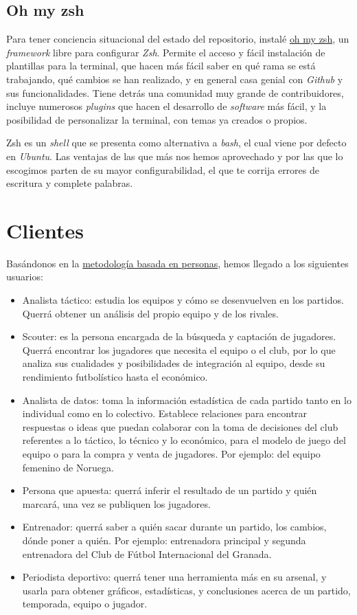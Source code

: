 \subsection{Oh my zsh}
Para tener conciencia situacional del estado del repositorio, instalé \href{https://ohmyz.sh/}{oh my zsh}, 
un \textit{framework} libre para configurar \textit{Zsh}. Permite el acceso y fácil instalación de plantillas para 
la terminal, que hacen más fácil saber en qué rama se está trabajando, qué cambios se han realizado, y en 
general casa genial con \textit{Github} y sus funcionalidades. Tiene detrás una comunidad muy grande de 
contribuidores, incluye numerosos \textit{plugins} que hacen el desarrollo de \textit{software} más fácil, 
y la posibilidad de personalizar la terminal, con temas ya creados o propios.

{Zsh} es un \textit{shell} que se presenta como alternativa a \textit{bash}, el cual viene por defecto en 
\textit{Ubuntu}. Las ventajas de las que más nos hemos aprovechado y por las que lo escogimos parten de 
su mayor configurabilidad, el que te corrija errores de escritura y complete palabras.

\section{Clientes}
Basándonos en la \href{https://www.designthinking.services/herramientas-design-thinking/metodo-persona/}{metodología basada en personas}, 
hemos llegado a los siguientes usuarios: 
\begin{itemize}
    \item Analista táctico: estudia los equipos y cómo se desenvuelven en los partidos. 
    Querrá obtener un análisis del propio equipo y de los rivales.
    \item Scouter: es la persona encargada de la búsqueda y captación 
    de jugadores. Querrá encontrar los jugadores que necesita el equipo 
    o el club, por lo que analiza sus cualidades y posibilidades de 
    integración al equipo, desde su rendimiento futbolístico hasta el 
    económico.
    \item Analista de datos: toma la información estadística de 
    cada partido tanto en lo individual como en lo colectivo. 
    Establece relaciones para encontrar respuestas o ideas que 
    puedan colaborar con la toma de decisiones del club referentes 
    a lo táctico, lo técnico y lo económico, para el modelo de 
    juego del equipo o para la compra y venta de jugadores. Por ejemplo: del 
    equipo femenino de Noruega. 
    \item Persona que apuesta: querrá inferir el resultado de un partido y 
    quién marcará, una vez se publiquen los jugadores. 
    \item Entrenador: querrá saber a quién sacar durante un partido, los 
    cambios, dónde poner a quién. Por ejemplo: entrenadora principal y 
    segunda entrenadora del Club de Fútbol Internacional del Granada.  
    \item Periodista deportivo: querrá tener una herramienta más en su arsenal, y 
    usarla para obtener gráficos, estadísticas, y conclusiones acerca de un partido, 
    temporada, equipo o jugador.
\end{itemize}


